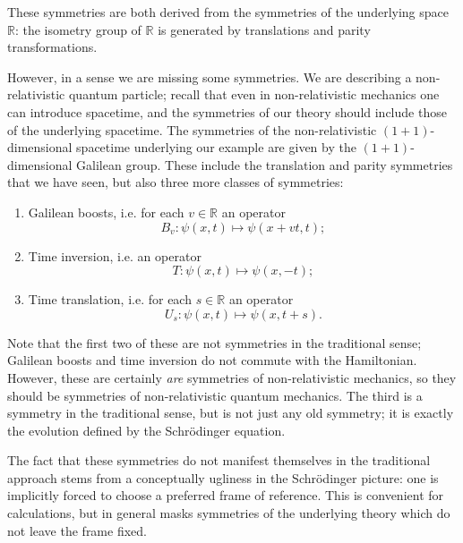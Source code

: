 \documentclass[a4paper,10pt]{scrreprt}
\newcommand{\R}{\mathbb{R}}
\theoremstyle{definition}
\theoremstyle{plain}
\theoremstyle{remark}
\begin{document}
These symmetries are both derived from the symmetries of the underlying space $\R$: the isometry group of $\R$ is generated by translations and parity transformations.

However, in a sense we are missing some symmetries. We are describing a non-relativistic quantum particle; recall that even in non-relativistic mechanics one can introduce spacetime, and the symmetries of our theory should include those of the underlying spacetime. The symmetries of the non-relativistic $(1+1)$-dimensional spacetime underlying our example are given by the $(1+1)$-dimensional Galilean group. These include the translation and parity symmetries that we have seen, but also three more classes of symmetries:
\begin{enumerate}
  \item Galilean boosts, i.e. for each $v \in \R$ an operator
    \begin{equation*}
      B_{v}\colon \psi(x, t) \mapsto \psi(x + vt, t);
    \end{equation*}

  \item Time inversion, i.e. an operator
    \begin{equation*}
      T\colon \psi(x, t) \mapsto \psi(x, -t);
    \end{equation*}

  \item Time translation, i.e. for each $s \in \R$ an operator 
    \begin{equation*}
      U_{s}\colon \psi(x, t) \mapsto \psi(x, t + s).
    \end{equation*}
\end{enumerate}

Note that the first two of these are not symmetries in the traditional sense; Galilean boosts and time inversion do not commute with the Hamiltonian. However, these are certainly \emph{are} symmetries of non-relativistic mechanics, so they should be symmetries of non-relativistic quantum mechanics. The third is a symmetry in the traditional sense, but is not just any old symmetry; it is exactly the evolution defined by the Schr\"{o}dinger equation.

The fact that these symmetries do not manifest themselves in the traditional approach stems from a conceptually ugliness in the Schr\"{o}dinger picture: one is implicitly forced to choose a preferred frame of reference. This is convenient for calculations, but in general masks symmetries of the underlying theory which do not leave the frame fixed.
\end{document}
